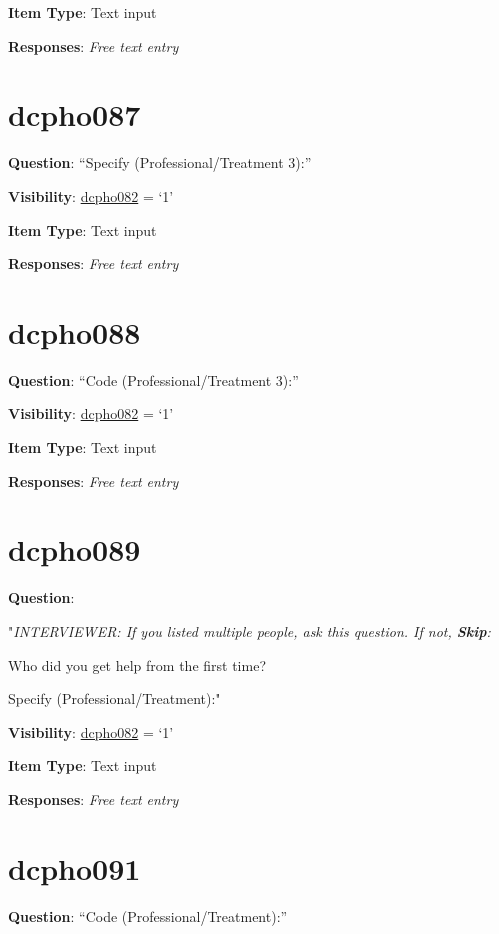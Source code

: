 \documentclass[]{book}
\begin{document}
\textbf{Item Type}: Text input

\textbf{Responses}: \emph{Free text entry}

\hypertarget{dcpho087}{%
\section{dcpho087}\label{dcpho087}}

\textbf{Question}: ``Specify (Professional/Treatment 3):''

\textbf{Visibility}: \protect\hyperlink{dcpho082}{dcpho082} = `1'

\textbf{Item Type}: Text input

\textbf{Responses}: \emph{Free text entry}

\hypertarget{dcpho088}{%
\section{dcpho088}\label{dcpho088}}

\textbf{Question}: ``Code (Professional/Treatment 3):''

\textbf{Visibility}: \protect\hyperlink{dcpho082}{dcpho082} = `1'

\textbf{Item Type}: Text input

\textbf{Responses}: \emph{Free text entry}

\hypertarget{dcpho089}{%
\section{dcpho089}\label{dcpho089}}

\textbf{Question}:

"\emph{INTERVIEWER: If you listed multiple people, ask this question. If not, \textbf{Skip}:}

Who did you get help from the first time?

Specify (Professional/Treatment):"

\textbf{Visibility}: \protect\hyperlink{dcpho082}{dcpho082} = `1'

\textbf{Item Type}: Text input

\textbf{Responses}: \emph{Free text entry}

\hypertarget{dcpho091}{%
\section{dcpho091}\label{dcpho091}}

\textbf{Question}: ``Code (Professional/Treatment):''
\end{document}
